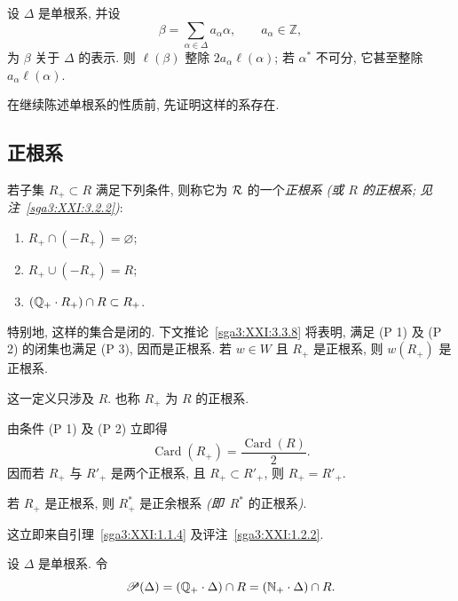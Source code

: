 \begin{corollary}\label{sga3:XXI:3.1.11}
设 \(\Delta\) 是单根系, 并设
\[
 \beta=\sum_{\alpha\in\Delta}a_\alpha\alpha,
 \qquad a_\alpha\in\mathbb Z,
\]
为 \(\beta\) 关于 \(\Delta\) 的表示. 则 \(\ell(\beta)\) 整除 \(2a_\alpha\ell(\alpha)\); 若 \(\alpha^\ast\) 不可分, 它甚至整除 \(a_\alpha\ell(\alpha)\).
\end{corollary}

在继续陈述单根系的性质前, 先证明这样的系存在.

\subsection{正根系}
\begin{definition}\label{sga3:XXI:3.2.1}
若子集 \(R_+\subset R\) 满足下列条件, 则称它为 \(\mathcal{R}\) 的一个\emph{正根系} \emph{(或 \(R\) 的正根系; 见注~\ref{sga3:XXI:3.2.2}\emph{)}}:
\begin{enumerate}
\item[(P 1)] \(R_+\cap(-R_+)=\varnothing\);
\item[(P 2)] \(R_+\cup(-R_+)=R\);
\item[(P 3)] \((\mathbb{Q}_{+}\cdot R_+)\cap R\subset R_+\).
\end{enumerate}
特别地, 这样的集合是闭的. 下文推论~\ref{sga3:XXI:3.3.8} 将表明, 满足 (P 1) 及 (P 2) 的闭集也满足 (P 3), 因而是正根系. 若 \(w\in W\) 且 \(R_+\) 是正根系, 则 \(w(R_+)\) 是正根系.
\end{definition}

\begin{remark}\label{sga3:XXI:3.2.2}
这一定义只涉及 \(R\). 也称 \(R_+\) 为 \(R\) 的正根系.
\end{remark}

\begin{remark}\label{sga3:XXI:3.2.3}
由条件 (P 1) 及 (P 2) 立即得
\[
 \operatorname{Card}(R_+)=\frac{\operatorname{Card}(R)}{2}.
\]
因而若 \(R_+\) 与 \(R'_+\) 是两个正根系, 且 \(R_+\subset R'_+\), 则 \(R_+=R'_+\).
\end{remark}

\begin{remark}\label{sga3:XXI:3.2.4}
若 \(R_+\) 是正根系, 则 \(R^\ast_+\) 是正余根系 \emph{(即}\ \(R^\ast\) 的正根系\emph{)}.
\end{remark}
这立即来自引理~\ref{sga3:XXI:1.1.4} 及评注~\ref{sga3:XXI:1.2.2}.

\begin{definition}\label{sga3:XXI:3.2.5}
设 \(\Delta\) 是单根系. 令
\[
 \mathscr{P}(\Delta)
 =(\mathbb{Q}_{+}\cdot\Delta)\cap R
 =(\mathbb N_+\cdot\Delta)\cap R.
\]
\end{definition}

